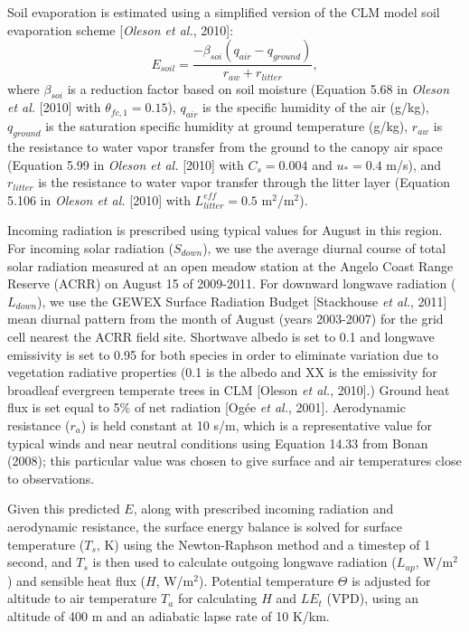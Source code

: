 Soil evaporation is estimated using a simplified version of the CLM model soil evaporation scheme [\textit{Oleson et al.}, 2010]:
\begin{equation}
E_{soil} = \frac{-\beta_{soi}(q_{air}-q_{ground})}{r_{aw}+r_{litter}},
\end{equation}
where $\beta_{soi}$ is a reduction factor based on soil moisture (Equation 5.68 in \textit{Oleson et al.} [2010] with $\theta_{fc,1}=0.15$), $q_{air}$ is the specific humidity of the air (g/kg), $q_{ground}$ is the saturation specific humidity at ground temperature (g/kg), $r_{aw}$ is the resistance to water vapor transfer from the ground to the canopy air space (Equation 5.99 in \textit{Oleson et al.} [2010] with $C_s=0.004$ and $u_*=0.4$ m/s), and $r_{litter}$ is the resistance to water vapor transfer through the litter layer (Equation 5.106 in \textit{Oleson et al.} [2010] with $L^{eff}_{litter}=0.5$ m$^2$/m$^2$).

Incoming radiation is prescribed using typical values for August in this region.  For incoming solar radiation ($S_{down}$), we use the average diurnal course of total solar radiation measured at an open meadow station at the Angelo Coast Range Reserve (ACRR) on August 15 of 2009-2011.  For downward longwave radiation ($L_{down}$), we use the GEWEX Surface Radiation Budget [Stackhouse \textit{et al.}, 2011] mean diurnal pattern from the month of August (years 2003-2007) for the grid cell nearest the ACRR field site.  Shortwave albedo is set to 0.1 and longwave emissivity is set to 0.95 for both species in order to eliminate variation due to vegetation radiative properties (0.1 is the albedo and XX is the emissivity for broadleaf evergreen temperate trees in CLM [Oleson \textit{et al.}, 2010].)  Ground heat flux is set equal to 5\% of net radiation [Og\'{e}e \textit{et al.}, 2001].  Aerodynamic resistance ($r_a$) is held constant at 10 s/m, which is a representative value for typical winds and near neutral conditions using Equation 14.33 from Bonan (2008); this particular value was chosen to give surface and air temperatures close to observations.

Given this predicted $E$, along with prescribed incoming radiation and aerodynamic resistance, the surface energy balance is solved for surface temperature ($T_s$, K) using the Newton-Raphson method and a timestep of 1 second, and $T_s$ is then used to calculate outgoing longwave radiation ($L_{up}$, W/m$^2$) and sensible heat flux ($H$, W/m$^2$).  Potential temperature $\Theta$ is adjusted for altitude to air temperature $T_a$ for calculating $H$ and $LE_t$ (VPD), using an altitude of 400 m and an adiabatic lapse rate of 10 K/km.  

